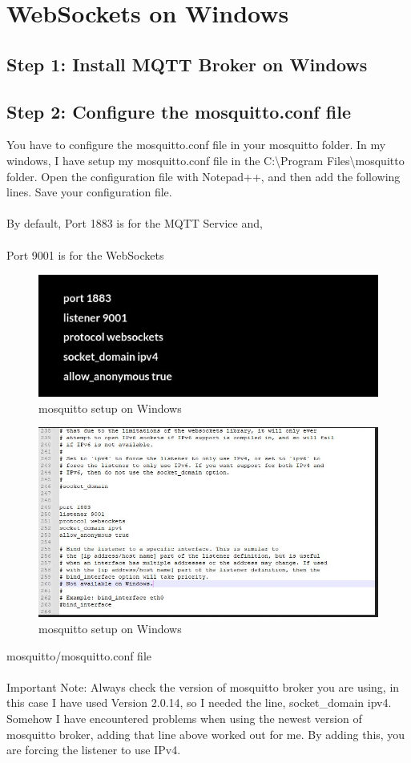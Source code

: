 \documentclass[oneside]{book}
\begin{document}
\section{WebSockets on Windows}
\subsection*{Step 1: Install MQTT Broker on Windows}
\subsection*{Step 2: Configure the mosquitto.conf file}
You have to configure the mosquitto.conf file in your mosquitto folder. In my windows, I have setup my mosquitto.conf file in the C:\textbackslash Program Files\textbackslash mosquitto folder. Open the configuration file with Notepad++, and then add the following lines. Save your configuration file.
\\\\
By default, Port 1883 is for the MQTT Service and,
\\\\
Port 9001 is for the WebSockets

\begin{figure}[H]
\centering
\includegraphics[scale=.8]{images/conf.jpg}
\caption{mosquitto setup on Windows}
\end{figure}

\begin{figure}[H]
\centering
\includegraphics[scale=.8]{images/windows_setup.jpg}
\caption{mosquitto setup on Windows}
\end{figure}
mosquitto/mosquitto.conf file
\\\\
Important Note: Always check the version of mosquitto broker you are using, in this case I have used Version 2.0.14, so I needed the line, socket\_domain ipv4. Somehow I have encountered problems when using the newest version of mosquitto broker, adding that line above worked out for me. By adding this, you are forcing the listener to use IPv4.
\end{document}
